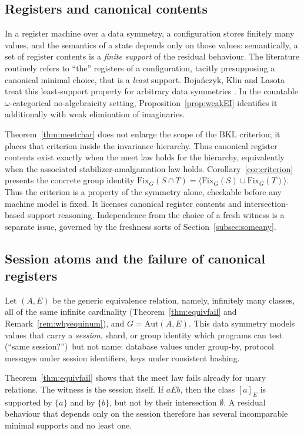 \documentclass{lmcs}
\newcommand{\Fix}{\mathrm{Fix}}
\newcommand{\Aut}{\mathrm{Aut}}
\begin{document}
\subsection{Registers and canonical contents}
\label{subsec:registers}

In a register machine over a data symmetry, a configuration stores
finitely many values, and the semantics of a state depends only on
those values: semantically, a set of register contents is a
\emph{finite support} of the residual behaviour. The literature routinely refers to ``the'' registers of a configuration, tacitly presupposing a canonical minimal choice, that is a \emph{least} support. Boja\'nczyk, Klin and Lasota treat this least-support property for arbitrary data symmetries \cite[Def.~4.11, Fact~9.2, Thm.~9.3]{BKL14}. In the countable $\omega$-categorical no-algebraicity setting, Proposition~\ref{prop:weakEI} identifies it additionally with weak elimination of imaginaries.

Theorem~\ref{thm:meetchar} does not enlarge the scope of the BKL criterion; it places that criterion inside the invariance hierarchy. Thus canonical register contents exist exactly when the meet law holds for the hierarchy, equivalently when the associated stabilizer-amalgamation law holds. Corollary~\ref{cor:criterion}
presents the concrete group identity
$\Fix_G(S\cap T)=\langle\Fix_G(S)\cup\Fix_G(T)\rangle$.
Thus the criterion is a property of the symmetry alone, checkable
before any machine model is fixed. It licenses canonical register
contents and intersection-based support reasoning. Independence from
the choice of a fresh witness is a separate issue, governed by the
freshness sorts of Section~\ref{subsec:someany}.

\subsection{Session atoms and the failure of canonical registers}
\label{subsec:sessions}

Let $(A,E)$ be the generic equivalence relation, namely, infinitely many classes, all of the same infinite cardinality
(Theorem~\ref{thm:equivfail} and Remark~\ref{rem:whyequinum}), and
$G=\Aut(A,E)$. This data symmetry models
values that carry a \emph{session}, shard, or group identity which
programs can test (``same session?'')\ but not name: database values
under \textsf{group-by}, protocol messages under session
identifiers, keys under consistent hashing.

Theorem~\ref{thm:equivfail} shows that the meet law fails already for
unary relations. The witness is the session itself. If $aEb$, then the
class $[a]_E$ is supported by $\{a\}$ and by $\{b\}$, but not by their
intersection $\emptyset$. A residual behaviour that depends only on the
session therefore has several incomparable minimal supports and no least one.
\end{document}
